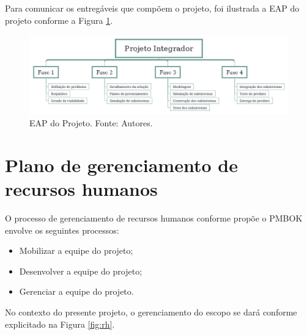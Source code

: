 Para comunicar os entregáveis que compõem o projeto, foi ilustrada a EAP do projeto conforme a Figura \ref{fig:eap_projeto}.

\begin{figure}[htpb!]
    \centering
    \includegraphics[scale= 0.5]{figuras/eap_projeto.png}
    \caption{EAP do Projeto. Fonte: Autores.}
    \label{fig:eap_projeto}
\end{figure}

\newpage

\section{Plano de gerenciamento de recursos humanos}

O processo de gerenciamento de recursos humanos conforme propõe o PMBOK envolve os seguintes processos:

\begin{itemize}
\item Mobilizar a equipe do projeto;
\item Desenvolver a equipe do projeto;
\item Gerenciar a equipe do projeto.
\end{itemize}

No contexto do presente projeto, o gerenciamento do escopo se dará conforme explicitado na Figura \ref{fig:rh}. 

